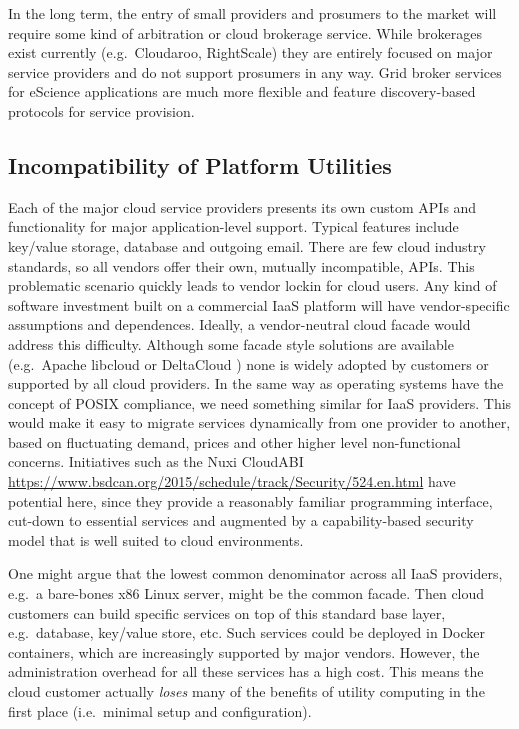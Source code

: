 \documentclass[conference,10pt]{IEEEtran}
\begin{document}
In the long term, the entry of small providers and prosumers to the market will require some kind of arbitration or cloud brokerage service. While brokerages exist currently (e.g.\ Cloudaroo, RightScale) they are entirely focused on major service providers and do not support prosumers in any way.
Grid broker services \cite{url4} for eScience applications are much more flexible and feature discovery-based protocols for service provision. 


\subsection{Incompatibility of Platform Utilities}

Each of the major cloud service providers presents its own custom APIs and functionality for major application-level support. Typical features include key/value storage, database and outgoing email.
There are few cloud industry standards, so all vendors offer their own, mutually incompatible, APIs.
This problematic scenario quickly leads to vendor lockin for cloud users. Any kind of software investment built on a commercial IaaS platform will have vendor-specific assumptions and dependences. 
Ideally, a vendor-neutral cloud facade \cite{martino15cross} would address this difficulty. Although some facade style solutions are available (e.g.\ Apache libcloud \cite{url5} or DeltaCloud \cite{url6}) none is widely adopted by customers or supported by all cloud providers.
In the same way as operating systems have the concept of POSIX compliance, we need something similar for IaaS providers. This would make it easy to migrate services dynamically from one provider to another, based on fluctuating demand, prices and other higher level non-functional concerns. Initiatives such as the Nuxi CloudABI \url{https://www.bsdcan.org/2015/schedule/track/Security/524.en.html} have potential here, since they provide a reasonably familiar programming interface, cut-down to essential services and augmented by a capability-based security model that is well suited to cloud environments. 

One might argue that the lowest common denominator across all IaaS providers, e.g.\ a bare-bones x86 Linux server, might be the common facade. Then cloud customers can build specific services on top of this standard base layer, e.g.\ database, key/value store, etc. Such services could be deployed in Docker containers, which are increasingly supported by major vendors. However, the administration overhead for all these services has a high cost.
This means the cloud customer actually \emph{loses} many of the benefits of utility computing in the first place
(i.e.\ minimal setup and configuration).
\end{document}
